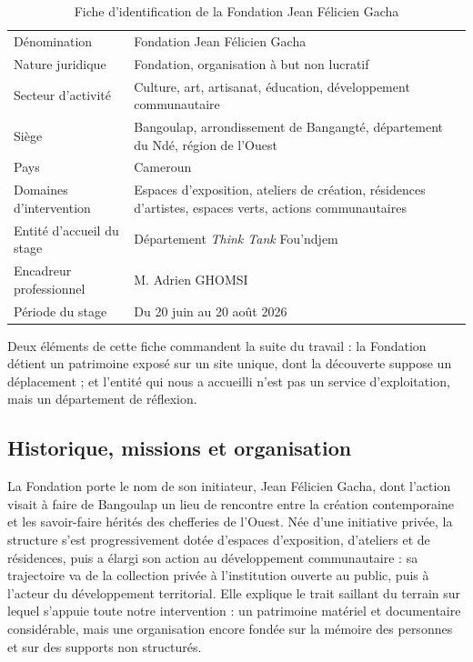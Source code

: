 \begin{table}[!ht]
\centering
\caption{Fiche d'identification de la Fondation Jean Félicien Gacha}
\label{tab:fiche}
\small
\begin{tabularx}{\textwidth}{|L{5.2cm}|X|}
\hline
{}
 &  \\ \hline
Dénomination & Fondation Jean Félicien Gacha \\ \hline
Nature juridique & Fondation, organisation à but non lucratif \\ \hline
Secteur d'activité & Culture, art, artisanat, éducation, développement communautaire \\ \hline
Siège & Bangoulap, arrondissement de Bangangté, département du Ndé, région de l'Ouest \\ \hline
Pays & Cameroun \\ \hline
Domaines d'intervention & Espaces d'exposition, ateliers de création, résidences d'artistes, espaces verts, actions communautaires \\ \hline
Entité d'accueil du stage & Département \emph{Think Tank} Fou'ndjem \\ \hline
Encadreur professionnel & M. Adrien GHOMSI \\ \hline
Période du stage & Du 20 juin au 20 août 2026 \\ \hline
\end{tabularx}
\end{table}

Deux éléments de cette fiche commandent la suite du travail : la Fondation
détient un patrimoine exposé sur un site unique, dont la découverte suppose un
déplacement ; et l'entité qui nous a accueilli n'est pas un service
d'exploitation, mais un département de réflexion.

\subsection{Historique, missions et organisation}

La Fondation porte le nom de son initiateur, Jean Félicien Gacha, dont l'action
visait à faire de Bangoulap un lieu de rencontre entre la création
contemporaine et les savoir-faire hérités des chefferies de l'Ouest. Née d'une
initiative privée, la structure s'est progressivement dotée d'espaces
d'exposition, d'ateliers et de résidences, puis a élargi son action au
développement communautaire : sa trajectoire va de la collection privée à
l'institution ouverte au public, puis à l'acteur du développement territorial.
Elle explique le trait saillant du terrain sur lequel s'appuie toute notre
intervention : un patrimoine matériel et documentaire considérable, mais une
organisation encore fondée sur la mémoire des personnes et sur des supports non
structurés.

